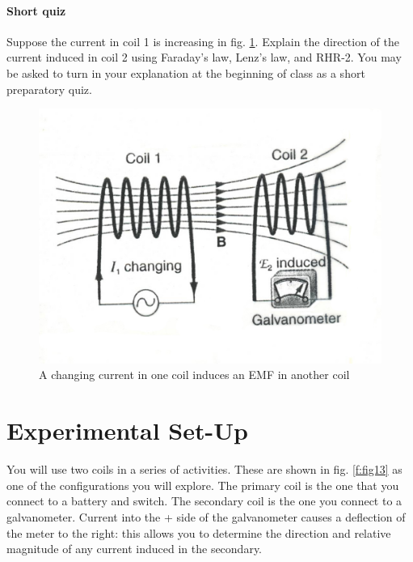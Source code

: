\paragraph{Short quiz}
Suppose the current in coil 1 is increasing in fig. \ref{f:fig12}.  Explain the direction of the current induced in coil 2 using Faraday's law, Lenz's law, and RHR-2.  You may be asked to turn in your explanation at the beginning of class as a short preparatory quiz.


\begin{figure}
	\centering
	\includegraphics[scale=0.8]{5bgraf/fig_12}
	\caption{A changing current in one coil induces an EMF in another coil}
	\label{f:fig12}
\end{figure}



\section{Experimental Set-Up}
You will use two coils in a series of activities.  These are shown in fig. \ref{f:fig13} as one of the configurations you will explore.  The primary coil is the one that you connect to a battery and switch.  The secondary coil is the one you connect to a galvanometer.  Current into the + side of the galvanometer causes a deflection of the meter to the right: this allows you to determine the direction and relative magnitude of any current induced in the secondary.


